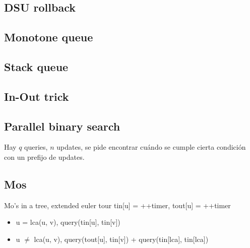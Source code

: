 
\subsection{DSU rollback }

\subsection{Monotone queue }


\subsection{Stack queue }


\subsection{In-Out trick }

\subsection{Parallel binary search }

Hay $q$ queries, $n$ updates, se pide encontrar cuándo se cumple cierta condición con un prefijo de updates.\\

\subsection{Mos }

Mo's in a tree, extended euler tour tin[u] = ++timer, tout[u] = ++timer 

\begin{itemize}
\item u = lca(u, v), query(tin[u], tin[v])
\item u $\neq$ lca(u, v), query(tout[u], tin[v]) + query(tin[lca], tin[lca]) 
\end{itemize}



